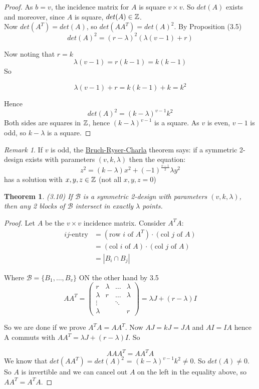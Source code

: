 \documentclass[]{article}
\newtheorem{thm}{Theorem}[section]
\theoremstyle{definition}
\theoremstyle{remark}
\newtheorem*{rem}{Remark}
\numberwithin{equation}{section}
\begin{document}
		\begin{proof}
			As $b = v$, the incidence matrix for $A$ is square $v \times v$. So $det(A)$ exists and moreover, since $A$ is square, $det(A) \in \mathbb{Z}$. \\

			Now $det(A^T) = det(A)$, so $det(AA^T) = det(A)^2$.
			By Proposition (3.5)
			\[
				det(A)^2 = (r - \lambda)^2(\lambda(v-1) + r)
			\]

			Now noting that $r = k$
			\[
				\lambda(v-1) = r(k-1) = k(k-1)
			\]
			So

			\[
				\lambda(v-1) + r = k(k-1) + k = k^2
			\]

			Hence
			\[
				det(A)^2 = (k - \lambda)^{v-1}k^2
			\]
			Both sides are squares in $\mathbb{Z}$, hence $(k-\lambda)^{v-1}$ is a square. As $v$ is even, $v-1$ is odd, so $k-\lambda$ is a square.
		\end{proof}

		\begin{rem}
			If $v$ is odd, the \underline{Bruch-Ryser-Charla} theorem says: if a symmetric 2-design exists with parameters $(v, k, \lambda)$ then the equation:
			\[
				z^2 = (k-\lambda)x^2 + (-1)^{\frac{v-1}{2}}\lambda y^2
			\]
			has a solution with $x,y,z \in \mathbb{Z}$ (not all $x,y,z = 0$)
		\end{rem}

		\begin{thm}(3.10)
			If $\mathcal{B}$ is a symmetric 2-design with parameters $(v,k, \lambda)$, then any 2 blocks of $\mathcal{B}$ intersect in exactly $\lambda$ points.
		\end{thm}

		\begin{proof}
			Let $A$ be the $v \times v$ incidence matrix. Consider $A^T A$:
			\begin{align*}
				\text{$ij$-entry} &= (\text{row $i$ of $A^T$}) \cdot (\text{col $j$ of $A$})\\
								  &= (\text{col $i$ of $A$}) \cdot (\text{col $j$ of $A$})\\
								  &= |B_i \cap B_j|
			\end{align*}

			Where $\mathcal{B} = \{B_1, \hdots, B_v\}$
			ON the other hand by 3.5
			\[
				AA^T = \begin{pmatrix}
				 		r & \lambda & \hdots & \lambda \\
				 		\lambda & r & \hdots & \lambda \\
				 		\vdots & & \ddots & \\
				 		\lambda & & & r
						\end{pmatrix} = \lambda J + (r-\lambda) I
			\]

			So we are done if we prove $A^T A = A A^T$.
			Now $AJ = kJ = JA$ and $AI = IA$ hence A commuts with $A A^T = \lambda J + (r - \lambda) I$. So

			\[AAA^T = A A^T A\]
			We know that $det(AA^T) = det(A)^2$ = $(k-\lambda)^{v-1}k^2 \neq 0$. So $det(A) \neq 0$. So $A$ is invertible and we can cancel out $A$ on the left in the equality above, so $AA ^T = A^T A$.
		\end{proof}
\end{document}
